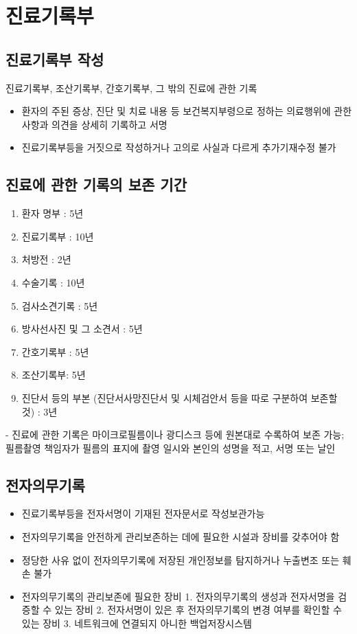 ﻿\section{진료기록부}
\subsection{진료기록부 작성}
진료기록부, 조산기록부, 간호기록부, 그 밖의 진료에 관한 기록
\begin{itemize}\tightlist
\item 환자의 주된 증상, 진단 및 치료 내용 등 보건복지부령으로 정하는 의료행위에 관한 사항과 의견을 상세히 기록하고 서명
\item 진료기록부등을 거짓으로 작성하거나 고의로 사실과 다르게 추가기재\cntrdot{}수정 불가
\end{itemize}

\subsection{진료에 관한 기록의 보존 기간}
\begin{enumerate}\tightlist
\item 환자 명부 : 5년
\item 진료기록부 : 10년
\item 처방전 : 2년
\item 수술기록 : 10년
\item 검사소견기록 : 5년
\item 방사선사진 및 그 소견서 : 5년
\item 간호기록부 : 5년
\item 조산기록부: 5년
\item 진단서 등의 부본 (진단서\cntrdot{}사망진단서 및 시체검안서 등을 따로 구분하여 보존할 것) : 3년
\end{enumerate}
- 진료에 관한 기록은 마이크로필름이나 광디스크 등에 원본대로 수록하여 보존 가능; 필름촬영 책임자가 필름의 표지에 촬영 일시와 본인의 성명을 적고, 서명 또는 날인

\subsection{전자의무기록}
\begin{itemize}\tightlist
\item 진료기록부등을 전자서명이 기재된 전자문서로 작성\cntrdot{}보관가능
\item 전자의무기록을 안전하게 관리\cntrdot{}보존하는 데에 필요한 시설과 장비를 갖추어야 함
\item 정당한 사유 없이 전자의무기록에 저장된 개인정보를 탐지하거나 누출\cntrdot{}변조 또는 훼손 불가
\item 전자의무기록의 관리\cntrdot{}보존에 필요한 장비 1. 전자의무기록의 생성과 전자서명을 검증할 수 있는 장비
2. 전자서명이 있은 후 전자의무기록의 변경 여부를 확인할 수 있는 장비
3. 네트워크에 연결되지 아니한 백업저장시스템
\end{itemize}

